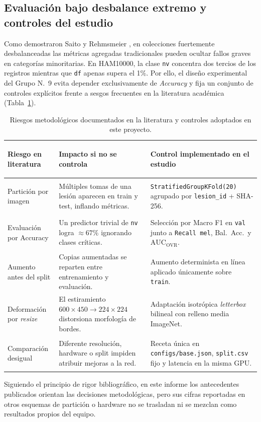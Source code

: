 \subsection{Evaluación bajo desbalance extremo y controles del estudio}
Como demostraron Saito y Rehmsmeier \cite{saito2015}, en colecciones fuertemente desbalanceadas las métricas agregadas tradicionales pueden ocultar fallos graves en categorías minoritarias. En HAM10000, la clase \texttt{nv} concentra dos tercios de los registros mientras que \texttt{df} apenas supera el 1\%. Por ello, el diseño experimental del Grupo N.\ 9 evita depender exclusivamente de \textit{Accuracy} y fija un conjunto de controles explícitos frente a sesgos frecuentes en la literatura académica (Tabla~\ref{tab:estado_arte}).

\begin{table}[htbp]\centering\small
\caption{Riesgos metodológicos documentados en la literatura y controles adoptados en este proyecto.}
\label{tab:estado_arte}
\begin{tabularx}{\textwidth}{@{}>{\bfseries\raggedright\arraybackslash}p{3.6cm}>{\raggedright\arraybackslash}p{5.5cm}>{\raggedright\arraybackslash}X@{}}
\toprule
\textbf{Riesgo en literatura} & \textbf{Impacto si no se controla} & \textbf{Control implementado en el estudio} \\ \midrule
Partición por imagen & Múltiples tomas de una lesión aparecen en train y test, inflando métricas. & \texttt{StratifiedGroupKFold(20)} agrupado por \texttt{lesion\_id} + SHA-256. \\
Evaluación por Accuracy & Un predictor trivial de \texttt{nv} logra $\approx 67\%$ ignorando clases críticas. & Selección por Macro F1 en \texttt{val} junto a \texttt{Recall mel}, Bal.\ Acc.\ y $\mathrm{AUC}_{\mathrm{OVR}}$. \\
Aumento antes del split & Copias aumentadas se reparten entre entrenamiento y evaluación. & Aumento determinista en línea aplicado únicamente sobre \texttt{train}. \\
Deformación por \textit{resize} & El estiramiento $600\times450 \to 224\times224$ distorsiona morfología de bordes. & Adaptación isotrópica \textit{letterbox} bilineal con relleno media ImageNet. \\
Comparación desigual & Diferente resolución, hardware o split impiden atribuir mejoras a la red. & Receta única en \texttt{configs/base.json}, \texttt{split.csv} fijo y latencia en la misma GPU. \\
\bottomrule
\end{tabularx}
\end{table}

Siguiendo el principio de rigor bibliográfico, en este informe los antecedentes publicados orientan las decisiones metodológicas, pero sus cifras reportadas en otros esquemas de partición o hardware no se trasladan ni se mezclan como resultados propios del equipo.
